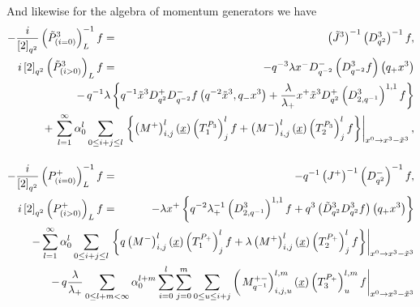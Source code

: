 \documentclass[a4paper,11pt,oneside]{article}
\begin{document}
And likewise for the algebra of momentum generators we have 
\begin{eqnarray}
-\frac{i}{\left[ 2\right] _{q^{2}}}\left( \tilde{P}_{\left( i=0\right)
}^{3}\right) _{L}^{-1}f &=&\left( \tilde{J}^{3}\right) ^{-1}\left(
D_{q^{2}}^{3}\right) ^{-1}f,  \label{DerMinP} \\
i\left[ 2\right] _{q^{2}}\left( \tilde{P}_{\left( i>0\right) }^{3}\right)
_{L}f &=&-q^{-3}\lambda x^{-}D_{q^{-2}}^{-}\left( D_{q^{-2}}^{3}f\right)
\left( q_{+}x^{3}\right)  \nonumber \\
&&\hspace*{-3.cm}-\,q^{-1}\lambda \left\{ q^{-1}\tilde{x}%
^{3}D_{q^{2}}^{+}D_{q^{-2}}^{-}f\left( q^{-2}\tilde{x}^{3},q_{-}x^{3}\right)
+\frac{\lambda }{\lambda _{+}}x^{+}\tilde{x}^{3}D_{q^{2}}^{+}\left(
D_{2,q^{-1}}^{3}\right) ^{1,1}f\right\}  \nonumber \\
&&\hspace*{-3.cm}+\,\sum_{l=1}^{\infty }\alpha _{0}^{l}\sum_{0\leq i+j\leq
l}\left. \left\{ \left( M^{+}\right) _{i,j}^{l}\left(\underline{x}\right)
\left(T^{P_3}_1\right)_j^lf 
+\left( M^{-}\right) _{i,j}^{l}\left( \underline{x%
}\right)
\left(T^{P_3}_2\right)_j^lf \right\}
\right| _{x^{0}\rightarrow
x^{3}-\tilde{x}^{3}} ,  \nonumber \\[0.16in]
-\frac{i}{\left[ 2\right] _{q^{2}}}\left( P_{\left( i=0\right) }^{+}\right)
_{L}^{-1}f &=&-q^{-1}\left( J^{+}\right) ^{-1}\left( D_{q^{2}}^{-}\right)
^{-1}f, \\
i\left[ 2\right] _{q^{2}}\left( P_{\left( i>0\right) }^{+}\right) _{L}f
&=&-\lambda x^{+}\left\{ q^{-2}\lambda _{+}^{-1}\left(
D_{2,q^{-1}}^{3}\right) ^{1,1}f+q^{3}\left( \tilde{D}%
_{q^{2}}^{3}D_{q^{2}}^{3}f\right) \left( q_{+}x^{3}\right) \right\} 
\nonumber \\
&&\hspace*{-3.cm}-\sum_{l=1}^{\infty }\alpha _{0}^{l}\sum_{0\leq i+j\leq
l}\left.\left\{ q\left( M^{-}\right) _{i,j}^{l}\left(\underline{x}\right)
\left(T^{P_+}_1\right)^l_jf 
+\lambda \left( M^{+}\right) _{i,j}^{l}\left( \underline{%
x}\right)\left(T^{P_+}_2\right)^l_jf
\right\}\right| _{x^{0}\rightarrow x^{3}-\tilde{x}%
^{3}}\nonumber \\
&&\hspace*{-3.cm}-\,q\frac{\lambda }{\lambda _{+}}\sum_{0\leq l+m<\infty
}\alpha _{0}^{l+m}\sum_{i=0}^{l}\sum_{j=0}^{m}\sum_{0\leq u\leq i+j}\left(
\left.M_{q^{-1}}^{+-}\right) _{i,j,u}^{l,m}\left( \underline{x}\right) 
\left(T^{P_+}_3\right)^{l,m}_uf
\right| _{x^{0}\rightarrow x^{3}-\tilde{x}^{3}} 

\end{eqnarray}
\end{document}

